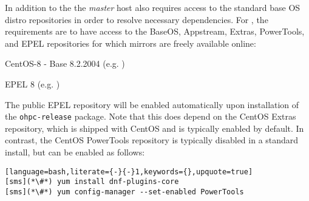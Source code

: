 In addition to the \OHPC{} 
\iftoggle{isxCAT}{and \xCAT{} package repositories,}{package repository,}
the {\em master} host also requires access to the standard base OS distro
repositories in order to resolve necessary dependencies. For \baseOS{}, the
requirements are to have access to the BaseOS, Appstream, Extras, PowerTools,
and EPEL repositories for which mirrors are freely available online:

\begin{itemize*}
\item CentOS-8 - Base 8.2.2004
  (e.g. \href{http://mirror.centos.org/centos-8/8/}
             {\color{blue}{http://mirror.centos.org/centos-8/8/}} )
\item EPEL 8 (e.g. \href{http://download.fedoraproject.org/pub/epel/8/}
                        {\color{blue}{http://download.fedoraproject.org/pub/epel/8/}} )
\end{itemize*}

\noindent The public EPEL repository will be enabled automatically upon
installation of the \texttt{ohpc-release} package. Note that this does depend
on the CentOS Extras repository, which is shipped with CentOS and is typically
enabled by default.  In contrast, the CentOS PowerTools repository is typically
disabled in a standard install, but can be enabled as follows:

\begin{lstlisting}[language=bash,literate={-}{-}1,keywords={},upquote=true]
[sms](*\#*) yum install dnf-plugins-core
[sms](*\#*) yum config-manager --set-enabled PowerTools
\end{lstlisting}
